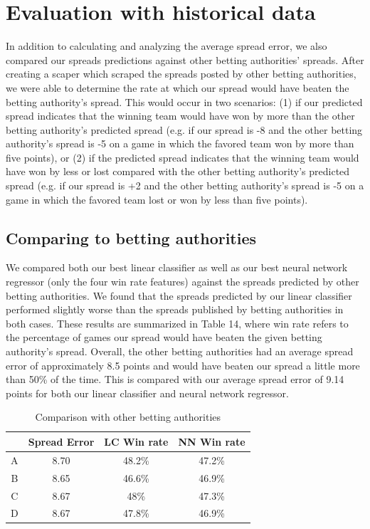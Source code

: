\documentclass{article}
\begin{document}
\section{Evaluation with historical data}
In addition to calculating and analyzing the average spread error, we also compared our spreads predictions against other betting authorities' spreads. After creating a scaper which scraped the spreads posted by other betting authorities, we were able to determine the rate at which our spread would have beaten the betting authority's spread. This would occur in two scenarios: (1) if our predicted spread indicates that the winning team would have won by more than the other betting authority's predicted spread (e.g. if our spread is -8 and the other betting authority's spread is -5 on a game in which the favored team won by more than five points), or (2) if the predicted spread indicates that the winning team would have won by less or lost compared with the other betting authority's predicted spread (e.g. if our spread is +2 and the other betting authority's spread is -5 on a game in which the favored team lost or won by less than five points).

\subsection{Comparing to betting authorities}
We compared both our best linear classifier as well as our best neural network regressor (only the four win rate features) against the spreads predicted by other betting authorities. We found that the spreads predicted by our linear classifier performed slightly worse than the spreads published by betting authorities in both cases. These results are summarized in Table 14, where win rate refers to the percentage of games our spread would have beaten the given betting authority's spread. Overall, the other betting authorities had an average spread error of approximately 8.5 points and would have beaten our spread a little more than 50\% of the time. This is compared with our average spread error of 9.14 points for both our linear classifier and neural network regressor.

\begin{table}
  \begin{center}
    \begin{tabular}{ | c | c | c | c| }
      \hline
                       & Spread Error      &LC  Win rate &NN Win rate \\ \hline
       A      & 8.70              & 48.2\% &47.2\%   \\ \hline
      B      & 8.65              & 46.6\%  &46.9\%  \\ \hline
      C      & 8.67              & 48\%      &47.3\%	\\ \hline
	D      & 8.67              & 47.8\%    &46.9\%\\ \hline
    \end{tabular}
  \end{center}
  \caption{Comparison with other betting authorities}
\end{table}
\end{document}
